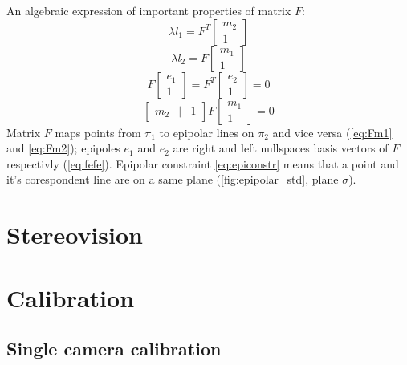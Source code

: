 An algebraic expression of important properties of matrix $F$:
\begin{equation}
    \label{eq:Fm2}
    \lambda l_1 = F^T \begin{bmatrix} m_2 \\ 1 \end{bmatrix}    
\end{equation}
\begin{equation}
    \label{eq:Fm1}
    \lambda l_2 = F \begin{bmatrix} m_1 \\ 1 \end{bmatrix}    
\end{equation}
\begin{equation}
    \label{eq:fefe}
    F \begin{bmatrix} e_1 \\ 1 \end{bmatrix} = F^T \begin{bmatrix} e_2 \\ 1 \end{bmatrix} = 0    
\end{equation}
\begin{equation}
    \label{eq:epiconstr}
    \begin{bmatrix} m_2 & | & 1 \end{bmatrix} F \begin{bmatrix} m_1 \\ 1 \end{bmatrix} = 0    
\end{equation}
Matrix $F$ maps points from $\pi_1$ to epipolar lines on $\pi_2$ and vice versa (\autoref{eq:Fm1} and \autoref{eq:Fm2}); epipoles $e_1$ and $e_2$ are right and left nullspaces basis vectors of $F$ respectivly (\autoref{eq:fefe}).
Epipolar constraint \autoref{eq:epiconstr} means that a point and it's corespondent line are on a same plane (\autoref{fig:epipolar_std}, plane $\sigma$).

\section{Stereovision}


\section{Calibration}
\subsection{Single camera calibration}

